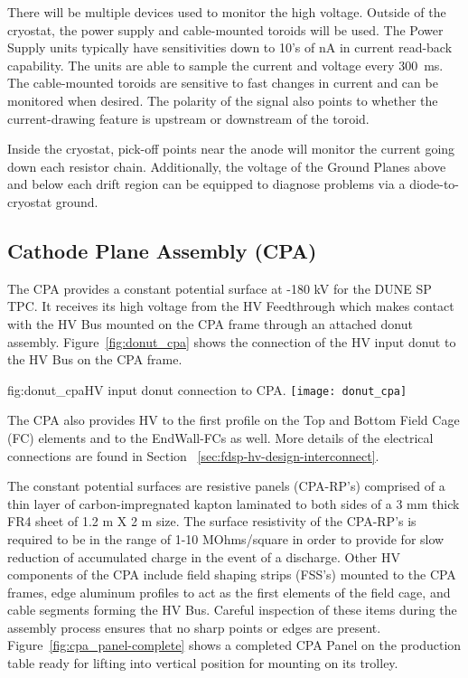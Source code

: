 There will be multiple devices used to monitor the high voltage.  Outside of the cryostat, the power supply and cable-mounted toroids will be used.  The Power Supply units typically have sensitivities down to 10's of nA in current read-back capability.  The units are able to sample the current and voltage every \SI{300}{ms}.  The cable-mounted toroids are sensitive to fast changes in current and can be monitored when desired.  The polarity of the signal also points to whether the current-drawing feature is upstream or downstream of the toroid.

Inside the cryostat, pick-off points near the anode will monitor the current going down each resistor chain.  Additionally, the voltage of the Ground Planes above and below each drift region can be equipped to diagnose problems via a diode-to-cryostat ground.


\subsection{Cathode Plane Assembly (CPA)}

The CPA provides a constant potential surface at -180 kV for the DUNE SP TPC.  It receives its high voltage from the HV Feedthrough which makes contact with the HV Bus mounted on the CPA frame through an attached donut assembly. Figure~\ref{fig:donut_cpa} shows the connection of the HV input donut to the HV Bus on the CPA frame. 

\begin{dunefigure}{fig:donut_cpa}{HV input donut connection to CPA.}
\texttt{[image: donut\_cpa]} %
\end{dunefigure}

The CPA also provides HV to the first profile on the Top and Bottom Field Cage (FC) elements and to the EndWall-FCs as well. More details of the electrical connections are found in Section ~\ref{sec:fdsp-hv-design-interconnect}.

The constant potential surfaces are resistive panels (CPA-RP's) comprised of a thin layer of carbon-impregnated kapton laminated to both sides of a 3 mm thick FR4 sheet of 1.2 m X 2 m size.  The surface resistivity of the CPA-RP's is required to be in the range of 1-10 MOhms/square in order to provide for slow reduction of accumulated charge in the event of a discharge.  Other HV components of the CPA include field shaping strips (FSS's) mounted to the CPA frames, edge aluminum profiles to act as the first elements of the field cage, and cable segments forming the HV Bus. Careful inspection of these items during the assembly process ensures that no sharp points or edges are present. Figure~\ref{fig:cpa_panel-complete} shows a completed CPA Panel on the production table ready for lifting into vertical position for mounting on its trolley.

